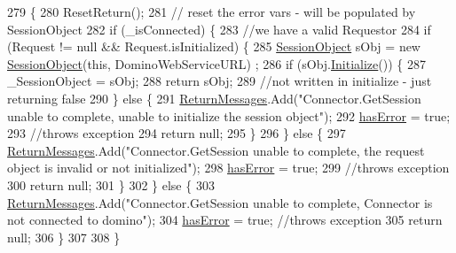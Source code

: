 \begin{DoxyCode}
279                                                                 \{
280         ResetReturn();
281         \textcolor{comment}{// reset the error vars - will be populated by SessionObject}
282         \textcolor{keywordflow}{if} (\_isConnected) \{
283             \textcolor{comment}{//we have a valid Requestor}
284             \textcolor{keywordflow}{if} (Request != null && Request.isInitialized) \{
285                 \hyperlink{class_session_object}{SessionObject} sObj = \textcolor{keyword}{new} \hyperlink{class_connector_a0a7bb42f9530796c086ab50785147ce9}{SessionObject}(\textcolor{keyword}{this}, DominoWebServiceURL)
      ;
286                 \textcolor{keywordflow}{if} (sObj.\hyperlink{class_session_object_af3b9c9d56d98c848061952ed935f815b}{Initialize}()) \{
287                     \_SessionObject = sObj;
288                     \textcolor{keywordflow}{return} sObj;
289                     \textcolor{comment}{//not written in initialize - just returning false}
290                 \} \textcolor{keywordflow}{else} \{
291                     \hyperlink{class_connector_a1ed422674b344524fd77998dcf6a9ba6}{ReturnMessages}.Add(\textcolor{stringliteral}{"Connector.GetSession unable to complete, unable to
       initialize the session object"});
292                     \hyperlink{class_connector_a079bae21a5417efa53bfe8954c0f533f}{hasError} = \textcolor{keyword}{true};
293                     \textcolor{comment}{//throws exception}
294                     \textcolor{keywordflow}{return} null;
295                 \}
296             \} \textcolor{keywordflow}{else} \{
297                 \hyperlink{class_connector_a1ed422674b344524fd77998dcf6a9ba6}{ReturnMessages}.Add(\textcolor{stringliteral}{"Connector.GetSession unable to complete, the request
       object is invalid or not initialized"});
298                 \hyperlink{class_connector_a079bae21a5417efa53bfe8954c0f533f}{hasError} = \textcolor{keyword}{true};
299                 \textcolor{comment}{//throws exception}
300                 \textcolor{keywordflow}{return} null;
301             \}
302         \} \textcolor{keywordflow}{else} \{
303             \hyperlink{class_connector_a1ed422674b344524fd77998dcf6a9ba6}{ReturnMessages}.Add(\textcolor{stringliteral}{"Connector.GetSession unable to complete, Connector is not
       connected to domino"});
304             \hyperlink{class_connector_a079bae21a5417efa53bfe8954c0f533f}{hasError} = \textcolor{keyword}{true};  \textcolor{comment}{//throws exception}
305             \textcolor{keywordflow}{return} null;
306         \}
307 
308     \}
\end{DoxyCode}
\mbox{\label{class_connector_a2ceb19719cfc04adc4c2d299e19e1447}} 
